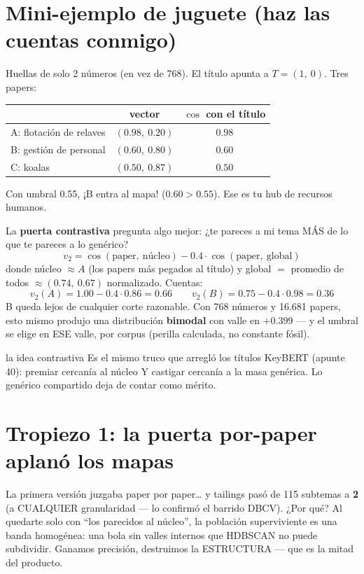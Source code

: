 \documentclass[11pt,a4paper]{article}
\begin{document}
\section{Mini-ejemplo de juguete (haz las cuentas conmigo)}

Huellas de solo 2 números (en vez de 768). El título apunta a $T=(1,\ 0)$. Tres papers:

\begin{center}
\begin{tabular}{lcc}
 & vector & $\cos$ con el título \\
\hline
A: flotación de relaves & $(0.98,\ 0.20)$ & $0.98$ \\
B: gestión de personal  & $(0.60,\ 0.80)$ & $0.60$ \\
C: koalas               & $(0.50,\ 0.87)$ & $0.50$ \\
\end{tabular}
\end{center}

Con umbral 0.55, ¡B entra al mapa! ($0.60 > 0.55$). Ese es tu hub de recursos humanos.

La \textbf{puerta contrastiva} pregunta algo mejor: ¿te pareces a mi tema MÁS de lo que
te pareces a lo genérico?
\[
v_2 = \cos(\mbox{paper},\ \mbox{núcleo}) - 0.4 \cdot \cos(\mbox{paper},\ \mbox{global})
\]
donde núcleo $\approx A$ (los papers más pegados al título) y global $=$ promedio de
todos $\approx (0.74,\ 0.67)$ normalizado. Cuentas:
\[
v_2(A) = 1.00 - 0.4 \cdot 0.86 = \mathbf{0.66}
\qquad
v_2(B) = 0.75 - 0.4 \cdot 0.98 = \mathbf{0.36}
\]
B queda lejos de cualquier corte razonable. Con 768 números y 16.681 papers, esto mismo
produjo una distribución \textbf{bimodal} con valle en $+0.399$ --- y el umbral se elige
en ESE valle, por corpus (perilla calculada, no constante fósil).

\begin{concepto}{la idea contrastiva}
Es el mismo truco que arregló los títulos KeyBERT (apunte 40): premiar cercanía al
núcleo Y castigar cercanía a la masa genérica. Lo genérico compartido deja de contar
como mérito.
\end{concepto}

\section{Tropiezo 1: la puerta por-paper aplanó los mapas}

La primera versión juzgaba paper por paper\ldots{} y tailings pasó de 115 subtemas a
\textbf{2} (a CUALQUIER granularidad --- lo confirmó el barrido DBCV). ¿Por qué? Al
quedarte solo con ``los parecidos al núcleo'', la población superviviente es una banda
homogénea: una bola sin valles internos que HDBSCAN no puede subdividir. Ganamos
precisión, destruimos la ESTRUCTURA --- que es la mitad del producto.
\end{document}
